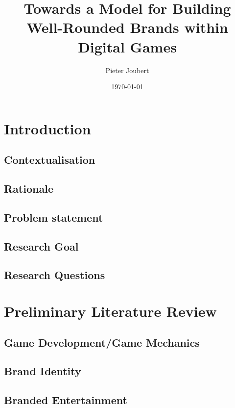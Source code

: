 \documentclass{article}
\begin{document}
\title{Towards a Model for Building Well-Rounded Brands within Digital Games}
\author{Pieter Joubert}
\date{\today}
\maketitle 

\tableofcontents
\listoffigures

\section{Introduction}

\subsection{Contextualisation}

\subsection{Rationale}

\subsection{Problem statement}

\subsection{Research Goal}

\subsection{Research Questions}

\section{Preliminary Literature Review}

\subsection{Game Development/Game Mechanics}

\subsection{Brand Identity}

\subsection{Branded Entertainment}
\end{document}
